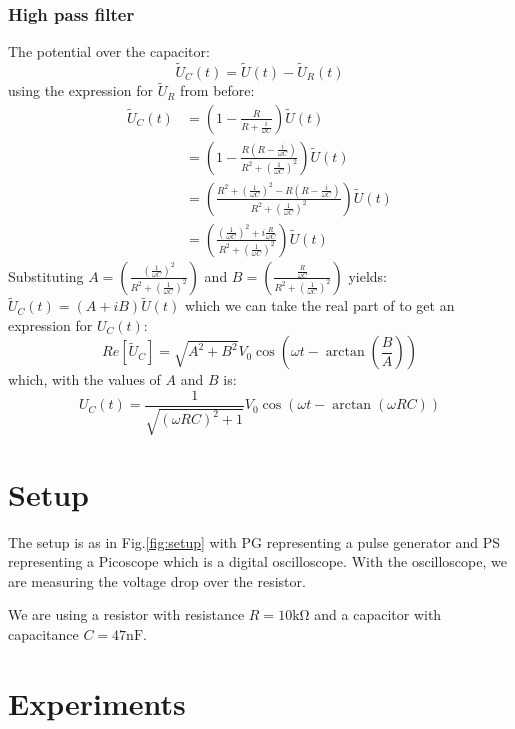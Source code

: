 \documentclass[../main/main.tex]{subfiles}
\begin{document}
\subsubsection{High pass filter}
The potential over the capacitor:
\[
\tilde{U}_C(t) = \tilde{U}(t)-\tilde{U}_R(t)
\]
using the expression for \(\tilde{U}_R\) from before:
\[
\begin{split}
\tilde{U}_C(t) &= \left(1-\frac{R}{R+\frac{i}{\omega C}}\right)\tilde{U}(t)  \\
               &= \left(1-\frac{R(R-\frac{i}{\omega C})}{R^2+\left(\frac{1}{\omega C}\right)^2}\right)\tilde{U}(t)\\
               &= \left(\frac{R^2+\left(\frac{1}{\omega C}\right)^2-R(R-\frac{i}{\omega C})}{R^2+\left(\frac{1}{\omega C}\right)^2}\right)\tilde{U}(t)\\
               &= \left(\frac{\left(\frac{1}{\omega C}\right)^2+i\frac{R}{\omega C}}{R^2+\left(\frac{1}{\omega C}\right)^2}\right)\tilde{U}(t)
\end{split}
\]
Substituting
\( A = \left(\frac{\left(\frac{1}{\omega C}\right)^2}{R^2+\left(\frac{1}{\omega C}\right)^2}\right) \) and
\(B = \left(\frac{\frac{R}{\omega C}}{R^2+\left(\frac{1}{\omega C}\right)^2}\right)\)
yields:
\(
\tilde{U}_C(t) = (A + iB)\tilde{U}(t)
\)
which we can take the real part of to get an expression for \(U_C(t)\):
\[
Re[\tilde{U}_C] = \sqrt{A^2+B^2}V_0 \cos\left(\omega t-\arctan\left(\frac{B}{A}\right)\right)
\]
which, with the values of \(A\) and \(B\) is:
\[
U_C(t) = \frac{1}{\sqrt{(\omega R C)^2 +1}}V_0 \cos\left(\omega t-\arctan\left(\omega RC\right)\right)
\]









\section*{Setup}

The setup is as in Fig.\ref{fig:setup} with PG representing a pulse generator and PS representing a Picoscope which is a digital oscilloscope.
With the oscilloscope, we are measuring the voltage drop over the resistor.

We are using a resistor with resistance \( R = 10 \si{\kilo\ohm} \) and a capacitor with capacitance \( C = 47 \si{\nano\farad} \).

\section{Experiments}
\end{document}
